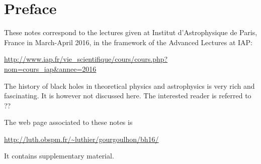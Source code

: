 \chapter*{Preface}

These notes correspond to the lectures given at
Institut d'Astrophysique de Paris, France in March-April 2016, in the
framework of the Advanced Lectures at IAP:

\centerline{\url{http://www.iap.fr/vie_scientifique/cours/cours.php?nom=cours_iap&annee=2016}}

\vspace{2ex}

The history of black holes in theoretical physics and astrophysics is
very rich and fascinating. It is however not discussed here. The interested
reader is referred to ??


The web page associated to these notes is

\centerline{\url{http://luth.obspm.fr/~luthier/gourgoulhon/bh16/}}

It contains supplementary material.
